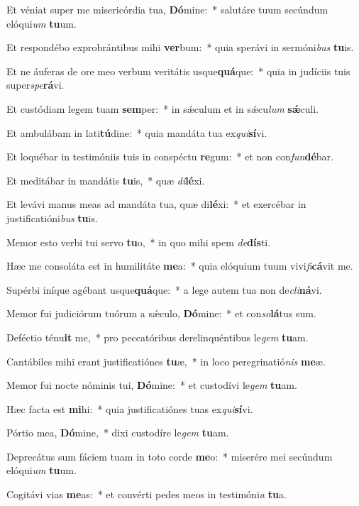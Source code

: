 \item Et véniat super me misericórdia tua, \textbf{Dó}mine:~* salutáre tuum secúndum elóqui\textit{um} \textbf{tu}um.
\item Et respondébo exprobrántibus mihi \textbf{ver}bum:~* quia sperávi in sermóni\textit{bus} \textbf{tu}is.
\item Et ne áuferas de ore meo verbum veritátis usque\textbf{quá}que:~* quia in judíciis tuis super\textit{spe}\textbf{rá}vi.
\item Et custódiam legem tuam \textbf{sem}per:~* in sǽculum et in sǽcu\textit{lum} \textbf{sǽ}culi.
\item Et ambulábam in lati\textbf{tú}dine:~* quia mandáta tua ex\textit{qui}\textbf{sí}vi.
\item Et loquébar in testimóniis tuis in conspéctu \textbf{re}gum:~* et non con\textit{fun}\textbf{dé}bar.
\item Et meditábar in mandátis \textbf{tu}is,~* quæ \textit{di}\textbf{lé}xi.
\item Et levávi manus meas ad mandáta tua, quæ di\textbf{lé}xi:~* et exercébar in justificatióni\textit{bus} \textbf{tu}is.
\item Memor esto verbi tui servo \textbf{tu}o,~* in quo mihi spem \textit{de}\textbf{dís}ti.
\item Hæc me consoláta est in humilitáte \textbf{me}a:~* quia elóquium tuum vivi\textit{fi}\textbf{cá}vit me.
\item Supérbi iníque agébant usque\textbf{quá}que:~* a lege autem tua non de\textit{cli}\textbf{ná}vi.
\item Memor fui judiciórum tuórum a sǽculo, \textbf{Dó}mine:~* et con\textit{so}\textbf{lá}tus sum.
\item Deféctio ténu\textbf{it} me,~* pro peccatóribus derelinquéntibus le\textit{gem} \textbf{tu}am.
\item Cantábiles mihi erant justificatiónes \textbf{tu}æ,~* in loco peregrinatió\textit{nis} \textbf{me}æ.
\item Memor fui nocte nóminis tui, \textbf{Dó}mine:~* et custodívi le\textit{gem} \textbf{tu}am.
\item Hæc facta est \textbf{mi}hi:~* quia justificatiónes tuas ex\textit{qui}\textbf{sí}vi.
\item Pórtio mea, \textbf{Dó}mine,~* dixi custodíre le\textit{gem} \textbf{tu}am.
\item Deprecátus sum fáciem tuam in toto corde \textbf{me}o:~* miserére mei secúndum elóqui\textit{um} \textbf{tu}um.
\item Cogitávi vias \textbf{me}as:~* et convérti pedes meos in testimóni\textit{a} \textbf{tu}a.
